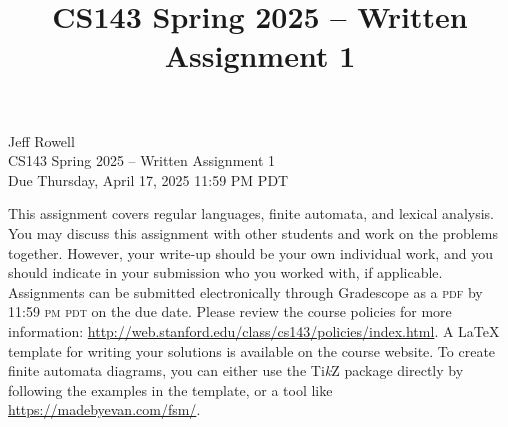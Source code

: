 \documentclass[11pt]{article}
\title{CS143 Spring 2025 -- Written Assignment 1}
\newcommand{\tikzname}{Ti\emph{k}Z}
\begin{document}
\begin{center}
\LARGE Jeff Rowell \\
{\LARGE{CS143 Spring 2025 -- Written Assignment 1}} \\
{\large Due Thursday, April 17, 2025 11:59 PM PDT}
\end{center}

This assignment covers regular languages, finite automata, and lexical analysis. You may discuss this assignment with other students and work on the problems together. However, your write-up should be your own individual work, and you should indicate in your submission who you worked with, if applicable. Assignments can be submitted electronically through Gradescope as a \textsc{pdf} by 11:59 \textsc{pm pdt} on the due date. Please review the course policies for more information: \url{http://web.stanford.edu/class/cs143/policies/index.html}. A \LaTeX{} template for writing your solutions is available on the course website. To create finite automata diagrams, you can either use the \tikzname{} package directly by following the examples in the template, or a tool like \url{https://madebyevan.com/fsm/}.
\end{document}

